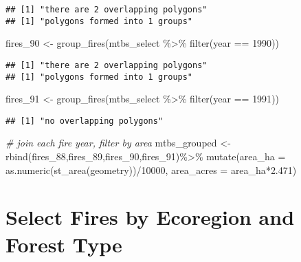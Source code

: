 \documentclass[
]{book}
\newenvironment{Shaded}{\begin{snugshade}}{\end{snugshade}}
\newcommand{\AttributeTok}[1]{\textcolor[rgb]{0.77,0.63,0.00}{#1}}
\newcommand{\CommentTok}[1]{\textcolor[rgb]{0.56,0.35,0.01}{\textit{#1}}}
\newcommand{\DecValTok}[1]{\textcolor[rgb]{0.00,0.00,0.81}{#1}}
\newcommand{\FloatTok}[1]{\textcolor[rgb]{0.00,0.00,0.81}{#1}}
\newcommand{\FunctionTok}[1]{\textcolor[rgb]{0.00,0.00,0.00}{#1}}
\newcommand{\NormalTok}[1]{#1}
\newcommand{\OtherTok}[1]{\textcolor[rgb]{0.56,0.35,0.01}{#1}}
\newcommand{\SpecialCharTok}[1]{\textcolor[rgb]{0.00,0.00,0.00}{#1}}
\begin{document}
\begin{verbatim}
## [1] "there are 2 overlapping polygons"
## [1] "polygons formed into 1 groups"
\end{verbatim}

\begin{Shaded}
\begin{Highlighting}[]
\NormalTok{fires\_90 }\OtherTok{\textless{}{-}} \FunctionTok{group\_fires}\NormalTok{(mtbs\_select }\SpecialCharTok{\%\textgreater{}\%}  \FunctionTok{filter}\NormalTok{(year }\SpecialCharTok{==} \DecValTok{1990}\NormalTok{))}
\end{Highlighting}
\end{Shaded}

\begin{verbatim}
## [1] "there are 2 overlapping polygons"
## [1] "polygons formed into 1 groups"
\end{verbatim}

\begin{Shaded}
\begin{Highlighting}[]
\NormalTok{fires\_91 }\OtherTok{\textless{}{-}} \FunctionTok{group\_fires}\NormalTok{(mtbs\_select }\SpecialCharTok{\%\textgreater{}\%}  \FunctionTok{filter}\NormalTok{(year }\SpecialCharTok{==} \DecValTok{1991}\NormalTok{))}
\end{Highlighting}
\end{Shaded}

\begin{verbatim}
## [1] "no overlapping polygons"
\end{verbatim}

\begin{Shaded}
\begin{Highlighting}[]
\CommentTok{\# join each fire year, filter by area}
\NormalTok{mtbs\_grouped }\OtherTok{\textless{}{-}} \FunctionTok{rbind}\NormalTok{(fires\_88,fires\_89,fires\_90,fires\_91)}\SpecialCharTok{\%\textgreater{}\%}
  \FunctionTok{mutate}\NormalTok{(}\AttributeTok{area\_ha =} \FunctionTok{as.numeric}\NormalTok{(}\FunctionTok{st\_area}\NormalTok{(geometry))}\SpecialCharTok{/}\DecValTok{10000}\NormalTok{,}
         \AttributeTok{area\_acres =}\NormalTok{ area\_ha}\SpecialCharTok{*}\FloatTok{2.471}\NormalTok{)}
\end{Highlighting}
\end{Shaded}

\hypertarget{select-fires-by-ecoregion-and-forest-type}{%
\section{Select Fires by Ecoregion and Forest Type}\label{select-fires-by-ecoregion-and-forest-type}}
\end{document}
